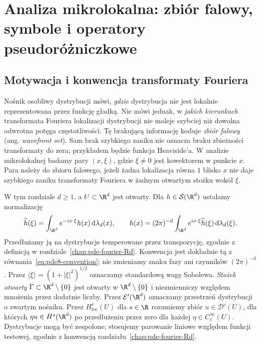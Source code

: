 \chapter[Analiza mikrolokalna]{Analiza mikrolokalna: zbiór falowy, symbole i operatory pseudoróżniczkowe}
\label{chap:pde31}

\section{Motywacja i konwencja transformaty Fouriera}
Nośnik osobliwy dystrybucji mówi, \emph{gdzie} dystrybucja
nie jest lokalnie reprezentowana przez funkcję gładką.
Nie mówi jednak, w \emph{jakich kierunkach} transformata
Fouriera lokalizacji dystrybucji nie maleje szybciej
niż dowolna odwrotna potęga częstotliwości.
Tę brakującą informację koduje \emph{zbiór falowy}
(ang. \emph{wavefront set}). Sam brak szybkiego zaniku
nie oznacza braku zbieżności transformaty do zera;
przykładem będzie funkcja Heaviside'a.
W analizie mikrolokalnej badamy pary $(x,\xi)$,
gdzie $\xi\ne0$ jest kowektorem w punkcie $x$.
Para należy do zbioru falowego, jeżeli żadna lokalizacja
równa $1$ blisko $x$ nie daje szybkiego zaniku
transformaty Fouriera w żadnym otwartym stożku
wokół $\xi$.

W tym rozdziale $d\ge1$, a $U\subset\R^d$ jest otwarty. Dla
$h\in\mathcal S(\R^d)$ ustalamy normalizację
\begin{equation}\label{eq:pde31-fourier}
 \widehat h(\xi)=\int_{\R^d}e^{-ix\cdot\xi}h(x)
 \,\mathrm d\lambda_d(x),\qquad
 h(x)=(2\pi)^{-d}\int_{\R^d}e^{ix\cdot\xi}\widehat h(\xi)
 \,\mathrm d\lambda_d(\xi).
\end{equation}
Przedłużamy ją na dystrybucje temperowane przez transpozycję,
zgodnie z definicją w rozdziale~\ref{chap:pde-fourier-Rd}.
Konwencja jest dokładnie tą z równania~\eqref{eq:pde8-convention};
nie zmieniamy znaku fazy ani czynników $(2\pi)^{-d}$.
Przez $\langle\xi\rangle=(1+|\xi|^2)^{1/2}$ oznaczamy standardową
wagę Sobolewa. \emph{Stożek otwarty} $\Gamma\subset\R^d\setminus\{0\}$
jest otwarty w $\R^d\setminus\{0\}$ i niezmienniczy
względem mnożenia przez dodatnie liczby.
Przez $\mathcal E'(\R^d)$ oznaczamy przestrzeń
dystrybucji o zwartym nośniku.
Przez $H^s_{\mathrm{loc}}(U)$ dla $s\in\R$ rozumiemy
zbiór $u\in\mathcal D'(U)$, dla których
$\eta u\in H^s(\R^d)$ po przedłużeniu przez zero
dla każdej $\eta\in C_c^\infty(U)$.
Dystrybucje mogą być zespolone; stosujemy parowanie
liniowe względem funkcji testowej, zgodnie z konwencją
rozdziału~\ref{chap:pde-fourier-Rd}.


